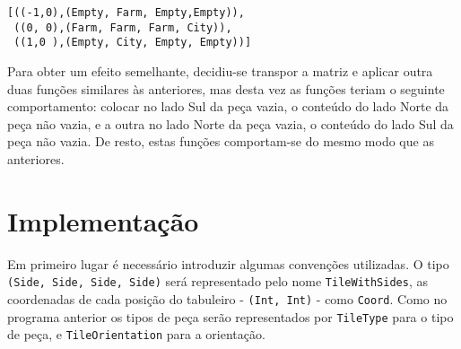 \begin{verbatim} 
[((-1,0),(Empty, Farm, Empty,Empty)),
 ((0, 0),(Farm, Farm, Farm, City)),
 ((1,0 ),(Empty, City, Empty, Empty))] 
\end{verbatim} 

Para obter um efeito semelhante, decidiu-se transpor a matriz e aplicar outra
duas funções similares às anteriores, mas desta vez as funções teriam o seguinte comportamento: colocar
no lado Sul da peça vazia, o conteúdo do lado Norte da peça não vazia, e a outra no lado Norte da peça
vazia, o conteúdo do lado Sul da peça não vazia. De resto, estas funções comportam-se do mesmo modo que
as anteriores.


\section{Implementação}
Em primeiro lugar é necessário introduzir algumas convenções utilizadas. O tipo \texttt{(Side, Side, Side, Side)} será representado pelo nome
\texttt{TileWithSides}, as coordenadas de cada posição do tabuleiro - \texttt{(Int, Int)} - como
\texttt{Coord}. Como no programa anterior os tipos de peça serão representados por \texttt{TileType} para o
tipo de peça, e \texttt{TileOrientation} para a orientação.


